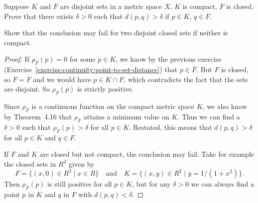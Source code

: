 \label{exercise:continuity:K-F-disjoint-delta}
Suppose $K$ and $F$ are disjoint sets in a metric space $X$, $K$ is
compact, $F$ is closed. Prove that there exists $\delta > 0$ such that
$d(p,q) > \delta$ if $p\in K$, $q\in F$.

Show that the conclusion may fail for two disjoint closed sets if
neither is compact.
\begin{proof}
  If $\rho_F(p) = 0$ for some $p\in K$, we know by the previous
  exercise (Exercise~\ref{exercise:continuity:point-to-set-distance})
  that $p\in\overline{F}$. But $F$ is closed, so $F = \overline{F}$
  and we would have $p\in K\cap F$, which contradicts the fact that
  the sets are disjoint. So $\rho_F(p)$ is strictly positive.

  Since $\rho_F$ is a continuous function on the compact metric space
  $K$, we also know by Theorem~4.16 that $\rho_F$ attains a minimum
  value on $K$. Thus we can find a $\delta > 0$ such that
  $\rho_F(p)>\delta$ for all $p\in K$. Restated, this means that
  $d(p,q) > \delta$ for all $p\in K$ and $q\in F$.

  If $F$ and $K$ are closed but not compact, the conclusion may
  fail. Take for example the closed sets in $R^2$ given by
  \begin{equation*}
    F = \{(x,0)\in R^2\mid x\in R\}
    \quad\text{and}\quad
    K = \{(x,y)\in R^2\mid y = 1/(1 + x^2)\}.
  \end{equation*}
  Then $\rho_F(p)$ is still positive for all $p\in K$, but for any
  $\delta > 0$ we can always find a point $p$ in $K$ and $q$ in $F$
  with $d(p,q) < \delta$.
\end{proof}

